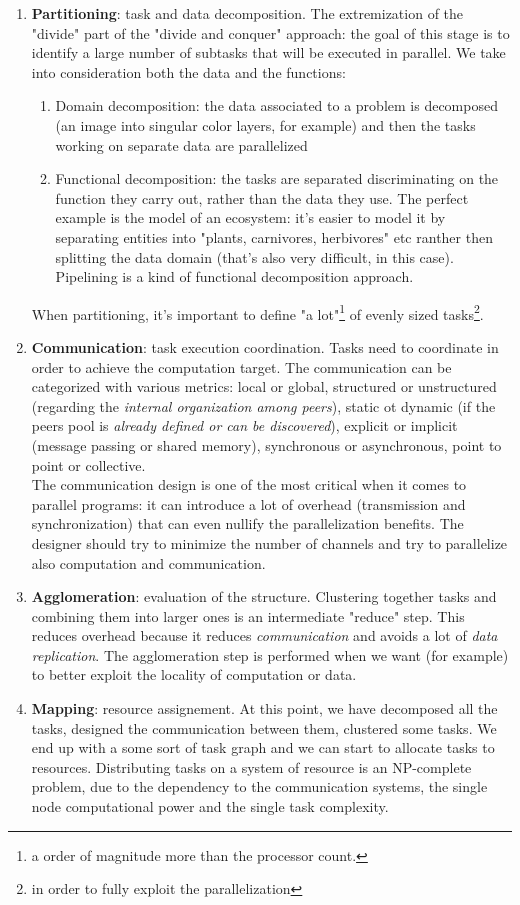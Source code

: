 \documentclass{article}
\begin{document}
			\begin{enumerate}
				\item \textbf{Partitioning}: task and data decomposition. The extremization of the "divide" part of the "divide and conquer" approach: the goal of this stage is to identify a large number of subtasks that will be executed in parallel. We take into consideration both the data and the functions:
					\begin{enumerate}
						\item Domain decomposition: the data associated to a problem is decomposed (an image into singular color layers, for example) and then the tasks working on separate data are parallelized
						\item Functional decomposition: the tasks are separated discriminating on the function they carry out, rather than the data they use. The perfect example is the model of an ecosystem: it's easier to model it by separating entities into "plants, carnivores, herbivores" etc ranther then splitting the data domain (that's also very difficult, in this case). Pipelining is a kind of functional decomposition approach.
					\end{enumerate}
					When partitioning, it's important to define "a lot"\footnote{a order of magnitude more than the processor count.} of evenly sized tasks\footnote{in order to fully exploit the parallelization}.
				\item \textbf{Communication}: task execution coordination. Tasks need to coordinate in order to achieve the computation target. The communication can be categorized with various metrics: local or global, structured or unstructured (regarding the \textit{internal organization among peers}), static ot dynamic (if the peers pool is \textit{already defined or can be discovered}), explicit or implicit (message passing or shared memory), synchronous or asynchronous, point to point or collective.\\The communication design is one of the most critical when it comes to parallel programs: it can introduce a lot of overhead (transmission and synchronization) that can even nullify the parallelization benefits. The designer should try to minimize the number of channels and try to parallelize also computation and communication.
				\item \textbf{Agglomeration}: evaluation of the structure. Clustering together tasks and combining them into larger ones is an intermediate "reduce" step. This reduces overhead because it reduces \textit{communication} and avoids a lot of \textit{data replication}. The agglomeration step is performed when we want (for example) to better exploit the locality of computation or data.
				\item \textbf{Mapping}: resource assignement. At this point, we have decomposed all the tasks, designed the communication between them, clustered some tasks. We end up with a some sort of task graph and we can start to allocate tasks to resources. Distributing tasks on a system of resource is an NP-complete problem, due to the dependency to the communication systems, the single node computational power and the single task complexity.
			\end{enumerate}
\end{document}
